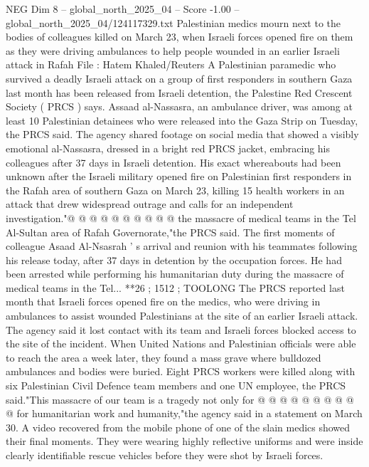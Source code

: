 \begin{textsample}{NEG Dim 8 – global\_north\_2025\_04 – Score -1.00 – global\_north\_2025\_04/124117329.txt}  \label{ex:f8_neg_419}
Palestinian medics mourn next to the bodies of colleagues killed on March 23, when Israeli forces opened fire on them as they were driving ambulances to help people wounded in an earlier Israeli attack in Rafah File : Hatem Khaled/Reuters A Palestinian paramedic who survived a deadly Israeli attack on a group of first responders in southern Gaza last month has been released from Israeli detention, the Palestine Red Crescent Society ( PRCS ) says.
Assaad al-Nassasra, an ambulance driver, was among at least 10 Palestinian detainees who were released into the Gaza Strip on Tuesday, the PRCS said.
The agency shared footage on social media that showed a visibly emotional al-Nassasra, dressed in a bright red PRCS jacket, embracing his colleagues after 37 days in Israeli detention.
His exact whereabouts had been unknown after the Israeli military opened fire on Palestinian first responders in the Rafah area of southern Gaza on March 23, killing 15 health workers in an attack that drew widespread outrage and calls for an independent investigation."@ @ @ @ @ @ @ @ @ @ the massacre of medical teams in the Tel Al-Sultan area of Rafah Governorate,"the PRCS said.
The first moments of colleague Asaad Al-Nsasrah ' s arrival and reunion with his teammates following his release today, after 37 days in detention by the occupation forces.
He had been arrested while performing his humanitarian duty during the massacre of medical teams in the Tel... **26 ; 1512 ; TOOLONG The PRCS reported last month that Israeli forces opened fire on the medics, who were driving in ambulances to assist wounded Palestinians at the site of an earlier Israeli attack.
The agency said it lost contact with its team and Israeli forces blocked access to the site of the incident.
When United Nations and Palestinian officials were able to reach the area a week later, they found a mass grave where bulldozed ambulances and bodies were buried.
Eight PRCS workers were killed along with six Palestinian Civil Defence team members and one UN employee, the PRCS said."This massacre of our team is a tragedy not only for @ @ @ @ @ @ @ @ @ @ for humanitarian work and humanity,"the agency said in a statement on March 30.
A video recovered from the mobile phone of one of the slain medics showed their final moments.
They were wearing highly reflective uniforms and were inside clearly identifiable rescue vehicles before they were shot by Israeli forces.

\end{textsample}
